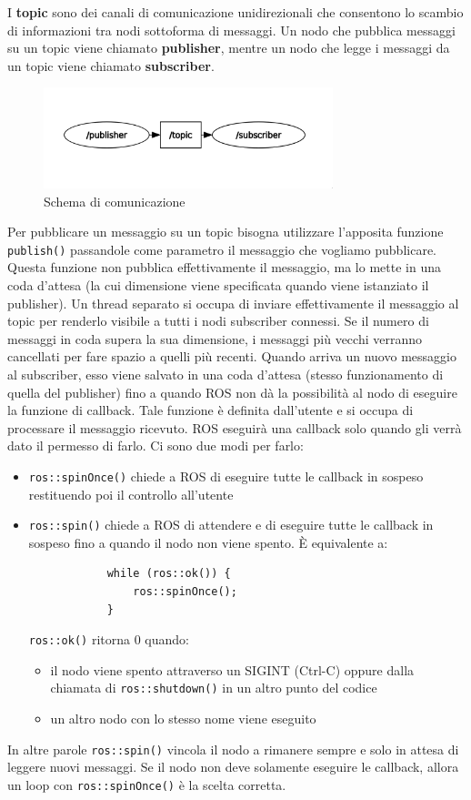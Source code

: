 I \textbf{topic} sono dei canali di comunicazione unidirezionali che consentono lo scambio di informazioni tra nodi sottoforma di 
messaggi. Un nodo che pubblica messaggi su un topic viene chiamato \textbf{publisher}, mentre un nodo che legge i messaggi da un topic 
viene chiamato \textbf{subscriber}.
\begin{figure}[H]
    \centering
    \includegraphics*[width=0.75\textwidth]{images/topic_graph.png}
    \caption{Schema di comunicazione}
    \label{fig:topic_graph}
\end{figure}
Per pubblicare un messaggio su un topic bisogna utilizzare l'apposita funzione \verb|publish()| passandole come parametro 
il messaggio che vogliamo pubblicare.
Questa funzione non pubblica effettivamente il messaggio, ma lo mette in una coda d'attesa (la cui 
dimensione viene specificata quando viene istanziato il publisher).
Un thread separato si occupa di inviare effettivamente il messaggio al topic per renderlo visibile a tutti i nodi subscriber 
connessi.
Se il numero di messaggi in coda supera la sua dimensione, i messaggi pi\`{u} vecchi verranno cancellati per fare spazio 
a quelli pi\`{u} recenti. Quando arriva un nuovo messaggio al subscriber, esso viene salvato 
in una coda d'attesa (stesso funzionamento di quella del publisher) fino a quando ROS non d\`{a} la possibilit\`{a} al nodo 
di eseguire la funzione di callback. Tale funzione \`{e} definita dall'utente e si occupa di processare il messaggio ricevuto. 
ROS eseguir\`{a} una callback solo quando gli verr\`{a} dato il permesso di farlo. Ci sono due modi per farlo:
\begin{itemize}
    \item \verb|ros::spinOnce()| chiede a ROS di eseguire tutte le callback in sospeso restituendo poi il controllo all'utente
    \item \verb|ros::spin()| chiede a ROS di attendere e di eseguire tutte le callback in sospeso fino a quando il nodo non 
          viene spento. \`{E} equivalente a:
          \begin{verbatim}
            while (ros::ok()) {
                ros::spinOnce();
            }
          \end{verbatim} 
          \verb|ros::ok()| ritorna 0 quando: 
          \begin{itemize}
            \item il nodo viene spento attraverso un SIGINT (Ctrl-C) oppure dalla chiamata di \verb|ros::shutdown()| in 
                  un altro punto del codice
            \item un altro nodo con lo stesso nome viene eseguito
          \end{itemize}
\end{itemize}
In altre parole \verb|ros::spin()| vincola il nodo a rimanere sempre e solo in attesa di leggere nuovi messaggi. 
Se il nodo non deve solamente eseguire le callback, allora un loop con \verb|ros::spinOnce()| \`{e} la scelta corretta. 

